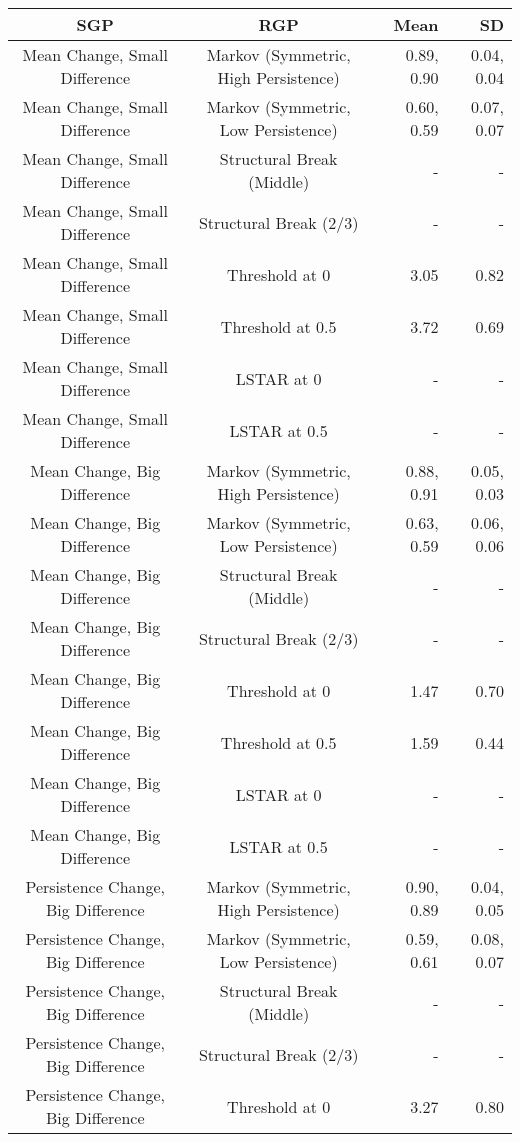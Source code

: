 \begin{table}[t]
\fontsize{12.0pt}{14.0pt}\selectfont
\begin{tabular*}{\linewidth}{@{\extracolsep{\fill}}ccrr}
\toprule
SGP & RGP & Mean & SD \\ 
\midrule\addlinespace[2.5pt]
Mean Change, Small Difference & Markov (Symmetric, High Persistence) & 0.89, 0.90 & 0.04, 0.04 \\ 
Mean Change, Small Difference & Markov (Symmetric, Low Persistence) & 0.60, 0.59 & 0.07, 0.07 \\ 
Mean Change, Small Difference & Structural Break (Middle) & - & - \\ 
Mean Change, Small Difference & Structural Break (2/3) & - & - \\ 
Mean Change, Small Difference & Threshold at 0 & 3.05 & 0.82 \\ 
Mean Change, Small Difference & Threshold at 0.5 & 3.72 & 0.69 \\ 
Mean Change, Small Difference & LSTAR at 0 & - & - \\ 
Mean Change, Small Difference & LSTAR at 0.5 & - & - \\ 
Mean Change, Big Difference & Markov (Symmetric, High Persistence) & 0.88, 0.91 & 0.05, 0.03 \\ 
Mean Change, Big Difference & Markov (Symmetric, Low Persistence) & 0.63, 0.59 & 0.06, 0.06 \\ 
Mean Change, Big Difference & Structural Break (Middle) & - & - \\ 
Mean Change, Big Difference & Structural Break (2/3) & - & - \\ 
Mean Change, Big Difference & Threshold at 0 & 1.47 & 0.70 \\ 
Mean Change, Big Difference & Threshold at 0.5 & 1.59 & 0.44 \\ 
Mean Change, Big Difference & LSTAR at 0 & - & - \\ 
Mean Change, Big Difference & LSTAR at 0.5 & - & - \\ 
Persistence Change, Big Difference & Markov (Symmetric, High Persistence) & 0.90, 0.89 & 0.04, 0.05 \\ 
Persistence Change, Big Difference & Markov (Symmetric, Low Persistence) & 0.59, 0.61 & 0.08, 0.07 \\ 
Persistence Change, Big Difference & Structural Break (Middle) & - & - \\ 
Persistence Change, Big Difference & Structural Break (2/3) & - & - \\ 
Persistence Change, Big Difference & Threshold at 0 & 3.27 & 0.80 \\ 

\end{tabular*}
\end{table}
